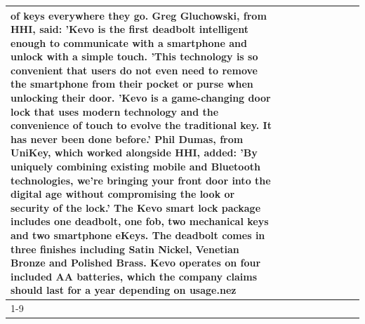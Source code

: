 \begin{table}[H]
\begin{tabular}{lllrlllll}
of keys everywhere they go. Greg Gluchowski, from HHI, said: 'Kevo is the first deadbolt intelligent enough to communicate with a smartphone and unlock with a simple touch. 'This technology is so convenient that users do not even need to remove the smartphone from their pocket or purse when unlocking their door. 'Kevo is a game-changing door lock that uses modern technology and the convenience of touch to evolve the traditional key. It has never been done before.' Phil Dumas, from UniKey, which worked alongside HHI, added: 'By uniquely combining existing mobile and Bluetooth technologies, we’re bringing your front door into the digital age without compromising the look or security of the lock.' The Kevo smart lock package includes one deadbolt, one fob, two mechanical keys and two smartphone eKeys. The deadbolt comes in three finishes including Satin Nickel, Venetian Bronze and Polished Brass. Kevo operates on four included AA batteries, which the company claims should last for a year depending on usage.nez \\
\cline{1-9}

\end{tabular}
\end{table}
